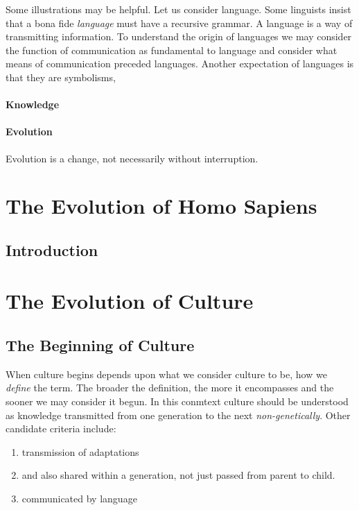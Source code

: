 \documentclass[10pt,titlepage]{book}
\begin{document}
Some illustrations may be helpful.
Let us consider language.
Some linguists insist that a bona fide \emph{language} must have a recursive grammar.
A language is a way of transmitting information.
To understand the origin of languages we may consider the function of communication as fundamental to language and consider what means of communication preceded languages.
Another expectation of languages is that they are symbolisms, 


\subsection{Knowledge}


\subsection{Evolution}

Evolution is a change, not necessarily without interruption.







\part{The Evolution of Homo Sapiens}

\chapter{Introduction}



\part{The Evolution of Culture}

\chapter{The Beginning of Culture}

When culture begins depends upon what we consider culture to be, how we \emph{define} the term.
The broader the definition, the more it encompasses and the sooner we may consider it begun.
In this conmtext culture should be understood as knowledge transmitted from one generation to the next \emph{non-genetically}.
Other candidate criteria include:

\begin{enumerate}
  \item transmission of adaptations
  \item and also shared within a generation, not just passed from parent to child.
  \item communicated by language
\end{enumerate}
\end{document}
